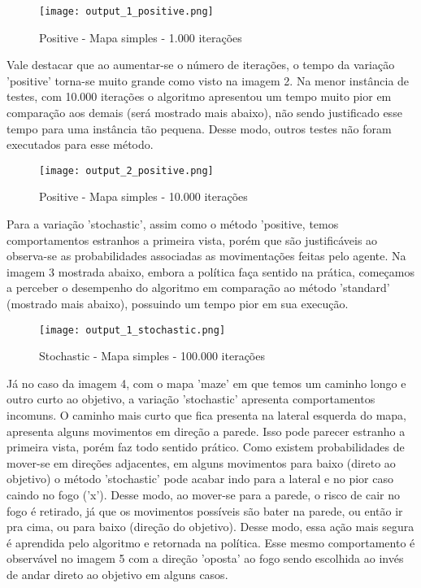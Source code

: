 \documentclass[10pt]{extarticle} %
\begin{document}
\begin{figure}[H]
    \centering
    \texttt{[image: output\_1\_positive.png]}
    \caption{Positive - Mapa simples - 1.000 iterações}
    \label{fig:enter-label}
\end{figure}

Vale destacar que ao aumentar-se o número de iterações, o tempo da variação 'positive' torna-se muito grande como visto na imagem 2. Na menor instância de testes, com 10.000 iterações o algoritmo apresentou um tempo muito pior em comparação aos demais (será mostrado mais abaixo), não sendo justificado esse tempo para uma instância tão pequena. Desse modo, outros testes não foram executados para esse método.

\begin{figure}[H]
    \centering
    \texttt{[image: output\_2\_positive.png]}
    \caption{Positive - Mapa simples - 10.000 iterações}
    \label{fig:enter-label}
\end{figure}

Para a variação 'stochastic', assim como o método 'positive, temos comportamentos estranhos a primeira vista, porém que são justificáveis ao observa-se as probabilidades associadas as movimentações feitas pelo agente. Na imagem 3 mostrada abaixo, embora a política faça sentido na prática, começamos a perceber o desempenho do algoritmo em comparação ao método 'standard' (mostrado mais abaixo), possuindo um tempo pior em sua execução.

\begin{figure}[H]
    \centering
    \texttt{[image: output\_1\_stochastic.png]}
    \caption{Stochastic - Mapa simples - 100.000 iterações}
    \label{fig:enter-label}
\end{figure}

Já no caso da imagem 4, com o mapa 'maze' em que temos um caminho longo e outro curto ao objetivo, a variação 'stochastic' apresenta comportamentos incomuns. O caminho mais curto que fica presenta na lateral esquerda do mapa, apresenta alguns movimentos em direção a parede. Isso pode parecer estranho a primeira vista, porém faz todo sentido prático. Como existem probabilidades de mover-se em direções adjacentes, em alguns movimentos para baixo (direto ao objetivo) o método 'stochastic' pode acabar indo para a lateral e no pior caso caindo no fogo ('x'). Desse modo, ao mover-se para a parede, o risco de cair no fogo é retirado, já que os movimentos possíveis são bater na parede, ou então ir pra cima, ou para baixo (direção do objetivo). Desse modo, essa ação mais segura é aprendida pelo algoritmo e retornada na política. Esse mesmo comportamento é observável no imagem 5 com a direção 'oposta' ao fogo sendo escolhida ao invés de andar direto ao objetivo em alguns casos.
\end{document}
